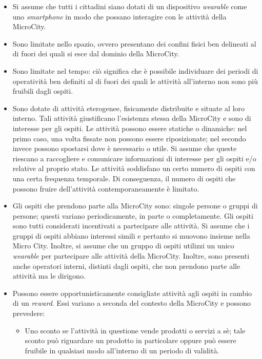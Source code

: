 \begin{itemize}
    \item Si assume che tutti i cittadini siano dotati di un dispositivo \textit{wearable} come uno \textit{smartphone} in modo che possano interagire con le attività della MicroCity.
    \item Sono limitate nello spazio, ovvero presentano dei confini fisici ben delineati al di fuori dei quali si esce dal dominio della MicroCity.
    \item Sono limitate nel tempo: ciò significa che è possibile individuare dei periodi di operatività ben definiti al di fuori dei quali le attività all'interno non sono più fruibili dagli ospiti.
    \item Sono dotate di attività eterogenee, fisicamente distribuite e situate al loro interno. Tali attività giustificano l'esistenza stessa della MicroCity e sono di interesse per gli ospiti. Le attività possono essere statiche o dinamiche: nel primo caso, una volta fissate non possono essere riposizionate; nel secondo invece possono spostarsi dove è necessario o utile. Si assume che queste riescano a raccogliere e comunicare informazioni di interesse per gli ospiti e/o relative al proprio stato.
    Le attività soddisfano un certo numero di ospiti con una certa frequenza temporale. Di conseguenza, il numero di ospiti che possono fruire dell'attività contemporaneamente è limitato.
    \item Gli ospiti che prendono parte alla MicroCity sono: singole persone o gruppi di persone; questi variano periodicamente, in parte o completamente. Gli ospiti sono tutti considerati incentivati a partecipare alle attività.
    Si assume che i gruppi di ospiti abbiano interessi simili e pertanto si muovono insieme nella Micro City. Inoltre, si assume che un gruppo di ospiti utilizzi un unico \textit{wearable} per partecipare alle attività della MicroCity.
    Inoltre, sono presenti anche operatori interni, distinti dagli ospiti, che non prendono parte alle attività ma le dirigono.
    \item Possono essere opportunisticamente consigliate  attività agli ospiti in cambio di un \textit{reward}. Essi variano a seconda del contesto della MicroCity e possono prevedere:
    \begin{itemize}
        \item Uno sconto se l'attività in questione vende prodotti o servizi a sè; tale sconto può riguardare un prodotto in particolare oppure può essere fruibile in qualsiasi modo all'interno di un periodo di validità.

\end{itemize}
\end{itemize}
